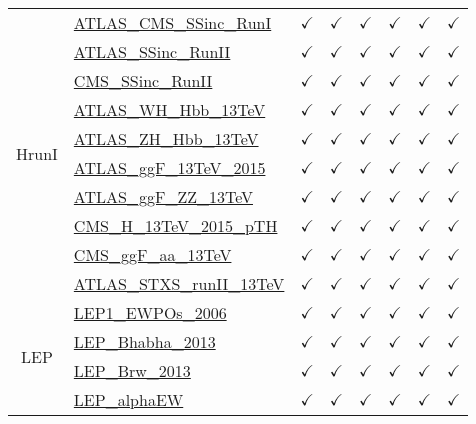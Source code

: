 \documentclass{article}
\begin{document}
\begin{longtable}{|c|l|c|c|c|c|c|c|}
\\ \hline
\multirow{10}{*}{HrunI}
 & \href{https://arxiv.org}{ATLAS_CMS_SSinc_RunI}  & $\checkmark$ & $\checkmark$ & $\checkmark$ & $\checkmark$ & $\checkmark$ & $\checkmark$\\ \cline{2-8}
 & \href{https://arxiv.org}{ATLAS_SSinc_RunII}  & $\checkmark$ & $\checkmark$ & $\checkmark$ & $\checkmark$ & $\checkmark$ & $\checkmark$\\ \cline{2-8}
 & \href{https://arxiv.org}{CMS_SSinc_RunII}  & $\checkmark$ & $\checkmark$ & $\checkmark$ & $\checkmark$ & $\checkmark$ & $\checkmark$\\ \cline{2-8}
 & \href{https://arxiv.org}{ATLAS_WH_Hbb_13TeV}  & $\checkmark$ & $\checkmark$ & $\checkmark$ & $\checkmark$ & $\checkmark$ & $\checkmark$\\ \cline{2-8}
 & \href{https://arxiv.org}{ATLAS_ZH_Hbb_13TeV}  & $\checkmark$ & $\checkmark$ & $\checkmark$ & $\checkmark$ & $\checkmark$ & $\checkmark$\\ \cline{2-8}
 & \href{https://arxiv.org}{ATLAS_ggF_13TeV_2015}  & $\checkmark$ & $\checkmark$ & $\checkmark$ & $\checkmark$ & $\checkmark$ & $\checkmark$\\ \cline{2-8}
 & \href{https://arxiv.org}{ATLAS_ggF_ZZ_13TeV}  & $\checkmark$ & $\checkmark$ & $\checkmark$ & $\checkmark$ & $\checkmark$ & $\checkmark$\\ \cline{2-8}
 & \href{https://arxiv.org}{CMS_H_13TeV_2015_pTH}  & $\checkmark$ & $\checkmark$ & $\checkmark$ & $\checkmark$ & $\checkmark$ & $\checkmark$\\ \cline{2-8}
 & \href{https://arxiv.org}{CMS_ggF_aa_13TeV}  & $\checkmark$ & $\checkmark$ & $\checkmark$ & $\checkmark$ & $\checkmark$ & $\checkmark$\\ \cline{2-8}
 & \href{https://arxiv.org}{ATLAS_STXS_runII_13TeV}  & $\checkmark$ & $\checkmark$ & $\checkmark$ & $\checkmark$ & $\checkmark$ & $\checkmark$
\\ \hline
\multirow{4}{*}{LEP}
 & \href{https://arxiv.org}{LEP1_EWPOs_2006}  & $\checkmark$ & $\checkmark$ & $\checkmark$ & $\checkmark$ & $\checkmark$ & $\checkmark$\\ \cline{2-8}
 & \href{https://arxiv.org}{LEP_Bhabha_2013}  & $\checkmark$ & $\checkmark$ & $\checkmark$ & $\checkmark$ & $\checkmark$ & $\checkmark$\\ \cline{2-8}
 & \href{https://arxiv.org}{LEP_Brw_2013}  & $\checkmark$ & $\checkmark$ & $\checkmark$ & $\checkmark$ & $\checkmark$ & $\checkmark$\\ \cline{2-8}
 & \href{https://arxiv.org}{LEP_alphaEW}  & $\checkmark$ & $\checkmark$ & $\checkmark$ & $\checkmark$ & $\checkmark$ & $\checkmark$

\end{longtable}
\end{document}
